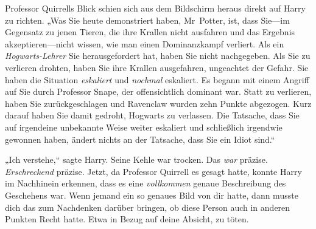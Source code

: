 Professor Quirrells Blick schien sich aus dem Bildschirm heraus direkt auf Harry zu richten. „Was Sie heute demonstriert haben, Mr~Potter, ist, dass Sie—im Gegensatz zu jenen Tieren, die ihre Krallen nicht ausfahren und das Ergebnis akzeptieren—nicht wissen, wie man einen Dominanzkampf verliert. Als ein \emph{Hogwarts-Lehrer} Sie herausgefordert hat, haben Sie nicht nachgegeben. Als Sie zu verlieren drohten, haben Sie ihre Krallen ausgefahren, ungeachtet der Gefahr. Sie haben die Situation \emph{eskaliert} und \emph{nochmal} eskaliert. Es begann mit einem Angriff auf Sie durch Professor Snape, der offensichtlich dominant war. Statt zu verlieren, haben Sie zurückgeschlagen und Ravenclaw wurden zehn Punkte abgezogen. Kurz darauf haben Sie damit gedroht, Hogwarts zu verlassen. Die Tatsache, dass Sie auf irgendeine unbekannte Weise weiter eskaliert und schließlich irgendwie gewonnen haben, ändert nichts an der Tatsache, dass Sie ein Idiot sind.“

„Ich verstehe,“ sagte Harry. Seine Kehle war trocken. Das \emph{war} präzise. \emph{Erschreckend} präzise. Jetzt, da Professor Quirrell es gesagt hatte, konnte Harry im Nachhinein erkennen, dass es eine \emph{vollkommen} genaue Beschreibung des Geschehens war. Wenn jemand ein so genaues Bild von dir hatte, dann musste dich das zum Nachdenken darüber bringen, ob diese Person auch in anderen Punkten Recht hatte. Etwa in Bezug auf deine Absicht, zu töten.

